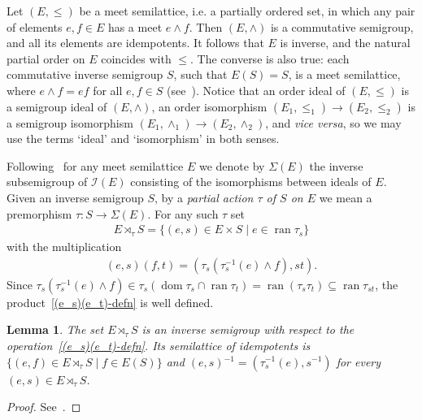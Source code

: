 \documentclass[reqno]{amsart}
\newtheorem{lem}[thrm]{Lemma}
\theoremstyle{definition}
\newcommand{\cI}[1]{\mathcal I{(#1)}}
\newcommand{\Sg}[1]{\Sigma{(#1)}}
\newcommand{\dom}[1]{\operatorname{\mathrm{dom}}{#1}}
\newcommand{\ran}[1]{\operatorname{\mathrm{ran}}{#1}}
\newcommand{\m}{{}^{-1}}
\newcommand{\0}{\theta}
\newcommand{\mt}{\wedge}
\newcommand{\rt}{\rtimes}
\begin{document}
Let $(E,\le)$ be a meet semilattice, i.e. a partially ordered set, in which any pair of elements $e,f\in E$ has a meet $e\mt f$. Then $(E,\mt)$ is a commutative semigroup, and all its elements are idempotents. It follows that $E$ is inverse, and the natural partial order on $E$ coincides with $\le$. The converse is also true: each commutative inverse semigroup $S$, such that $E(S)=S$, is a meet semilattice, where $e\mt f=ef$ for all $e,f\in S$ (see~\cite[Proposition 1.4.9]{Lawson}). Notice that an order ideal of $(E,\le)$ is a semigroup ideal of $(E,\mt)$, an order isomorphism $(E_1,\le_1)\to(E_2,\le_2)$ is a semigroup isomorphism $(E_1,\mt_1)\to(E_2,\mt_2)$, and {\it vice versa}, so we may use the terms `ideal' and `isomorphism' in both senses. 


Following~\cite{Petrich} for any meet semilattice $E$ we denote by $\Sg E$ the inverse subsemigroup of $\cI E$ consisting of the isomorphisms between ideals of $E$. Given an inverse semigroup $S$, by a {\it partial action $\tau$ of $S$ on $E$} we mean a premorphism $\tau:S\to\Sg E$. For any such $\tau$ set 
\begin{align}\label{E-rt-S-defn}
E\rt_\tau S=\{(e,s)\in E\times S\mid e\in\ran{\tau_s}\}
\end{align}
with the multiplication 
\begin{align}\label{(e_s)(e_t)-defn}
(e,s)(f,t)=(\tau_s(\tau\m_s(e)\mt f),st).
\end{align} 
Since $\tau_s(\tau\m_s(e)\mt f)\in\tau_s(\dom{\tau_s}\cap\ran{\tau_t})=\ran{(\tau_s\tau_t)}\subseteq\ran{\tau_{st}}$, the product~\eqref{(e_s)(e_t)-defn} is well defined.

\begin{lem}\label{L(E-tau-S)-inv-sem}
	The set $E\rt_\tau S$ is an inverse semigroup with respect to the operation~\eqref{(e_s)(e_t)-defn}. Its semilattice of idempotents is $\{(e,f)\in E\rt_\tau S\mid f\in E(S)\}$ and $(e,s)\m=(\tau\m_s(e),s\m)$ for every $(e,s)\in E\rt_\tau S$.
\end{lem}
\begin{proof}
	See~\cite[Lemmas VI.7.6--7]{Petrich}.
\end{proof}
\end{document}
